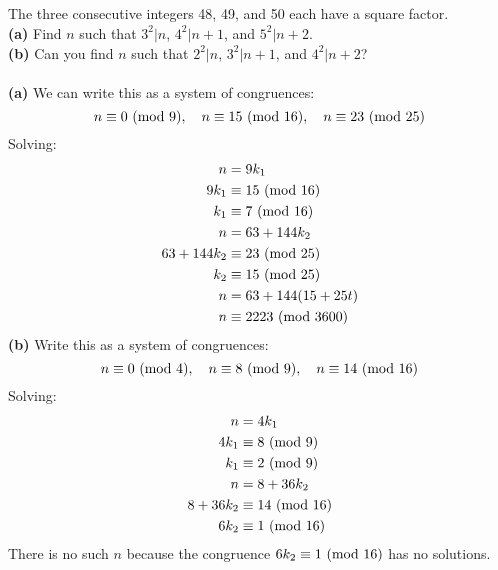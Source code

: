 \documentclass{article}
\begin{document}
\subsection{}
The three consecutive integers 48, 49, and 50 each have a square factor.\\
\textbf{(a)} Find $n$ such that $3^2|n$, $4^2|n+1$, and $5^2|n+2$.\\
\textbf{(b)} Can you find $n$ such that $2^2|n$, $3^2|n+1$, and $4^2|n+2$?\\~\\
\textbf{(a)} We can write this as a system of congruences:
\begin{equation*}
    n \equiv 0 \ (\mathrm{mod}\ 9), \quad
    n \equiv 15 \ (\mathrm{mod}\ 16), \quad
    n \equiv 23 \ (\mathrm{mod}\ 25)
\end{equation*}
Solving:
\begin{align*}
    n &= 9k_1\\
    9k_1 &\equiv 15 \ (\mathrm{mod}\ 16)\\
    k_1 &\equiv 7 \ (\mathrm{mod}\ 16)\\
    n &= 63 + 144k_2\\
    63 + 144k_2 &\equiv 23 \ (\mathrm{mod}\ 25)\\
    k_2 &\equiv 15 \ (\mathrm{mod}\ 25)\\
    n &= 63 + 144(15 + 25t)\\
    n &\equiv 2223 \ (\mathrm{mod}\ 3600)
\end{align*}
\textbf{(b)} Write this as a system of congruences:
\begin{equation*}
    n \equiv 0 \ (\mathrm{mod}\ 4), \quad
    n \equiv 8 \ (\mathrm{mod}\ 9), \quad
    n \equiv 14 \ (\mathrm{mod}\ 16)
\end{equation*}
Solving:
\begin{align*}
    n &= 4k_1\\
    4k_1 &\equiv 8 \ (\mathrm{mod}\ 9)\\
    k_1 &\equiv 2 \ (\mathrm{mod}\ 9)\\
    n &= 8 + 36k_2\\
    8 + 36k_2 &\equiv 14 \ (\mathrm{mod}\ 16)\\
    6k_2 &\equiv 1 \ (\mathrm{mod}\ 16)
\end{align*}
There is no such $n$ because the congruence $6k_2 \equiv 1 \ (\mathrm{mod}\ 16)$ has
no solutions.

\end{document}
